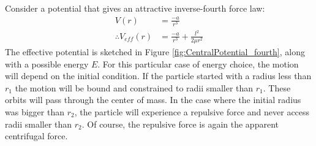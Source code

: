 Consider a potential that gives an attractive inverse-fourth force law:
\begin{align}
V(r)&=\frac{-a}{r^3}\nonumber\\
\therefore V_{eff}(r)&= \frac{-a}{r^3}+\frac{l^2}{2\mu r^2}
\end{align}
The effective potential is sketched in Figure \ref{fig:CentralPotential_fourth}, along with a possible energy $E$. For this particular case of energy choice, the motion will depend on the initial condition. If the particle started with a radius less than $r_1$ the motion will be bound and constrained to radii smaller than $r_1$. These orbits will pass through the center of mass. In the case where the initial radius was bigger than $r_2$, the particle will experience a repulsive force and never access radii smaller than $r_2$. Of course, the repulsive force is again the apparent centrifugal force.

